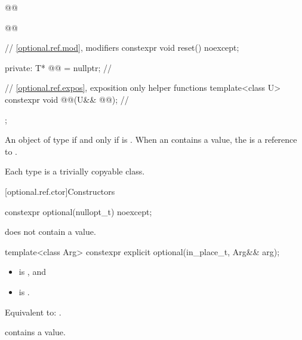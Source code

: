 \begin{codeblock}
{{    @@

    @@

    // \ref{optional.ref.mod}, modifiers
    constexpr void reset() noexcept;

  private:
    T* @@ = nullptr; // \expos

    // \ref{optional.ref.expos}, exposition only helper functions
    template<class U> constexpr void @@(U&& @@); // \expos
  };
}
\end{codeblock}

\pnum
An object of type   if and only if  is . When an  contains a value, the  is a reference to .

\pnum
Each type  is a trivially copyable class.

[optional.ref.ctor]{Constructors}

\begin{addedblock}
%
\begin{itemdecl}
constexpr optional(nullopt_t) noexcept;
\end{itemdecl}

\begin{itemdescr}
\pnum
\ensures
{} does not contain a value.
\end{itemdescr}
\end{addedblock}

%
\begin{itemdecl}
template<class Arg>
  constexpr explicit optional(in_place_t, Arg&& arg);
\end{itemdecl}

\begin{itemdescr}
\pnum
\constraints
\begin{itemize}
\item {} is , and
\item {} is .
\end{itemize}

\pnum
\effects
Equivalent to: .

\pnum
\ensures
{} contains a value.
\end{itemdescr}

